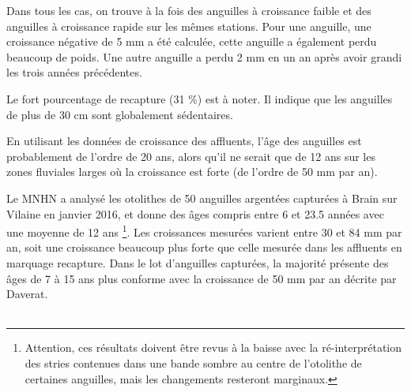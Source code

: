 \documentclass[10pt,twocolumn,titlepage,twoside]{article}\usepackage[]{graphicx}\usepackage[]{xcolor}
\begin{document}
Dans tous les cas,  on
trouve à la fois des anguilles à croissance faible et des anguilles à croissance
rapide sur les mêmes stations. Pour une anguille, une croissance négative de 5
mm a été calculée, cette anguille a également perdu beaucoup de poids. Une autre
anguille a perdu 2 mm en un an après avoir grandi les trois années précédentes.

Le fort pourcentage de recapture (31 \%) est à noter.
Il indique que les anguilles de plus de 30 cm sont globalement
sédentaires.

En utilisant les données de croissance des affluents, l'âge des anguilles est
probablement de l'ordre de 20 ans, alors qu'il ne serait que de 12 ans sur les
zones fluviales larges où la croissance est forte (de l'ordre de 50 mm par an). 

Le MNHN a analysé les otolithes de 50 anguilles argentées capturées à
Brain sur Vilaine en janvier 2016, et donne des âges compris entre 6 et 23.5
années avec une moyenne de 12 ans \footnote{Attention, ces résultats doivent être revus à la baisse avec
la ré-interprétation des stries contenues dans une bande sombre au centre de l'otolithe de certaines anguilles, mais les changements resteront marginaux.}. Les croissances mesurées varient entre 30 et 84
mm par an, soit une croissance beaucoup plus forte que celle mesurée dans les
affluents en marquage recapture. Dans le lot d'anguilles capturées, la majorité
présente des âges de 7 à 15 ans plus conforme avec la croissance de 50 mm par an
décrite par Daverat.\\ 

 \\ \mediumskip
\end{document}
